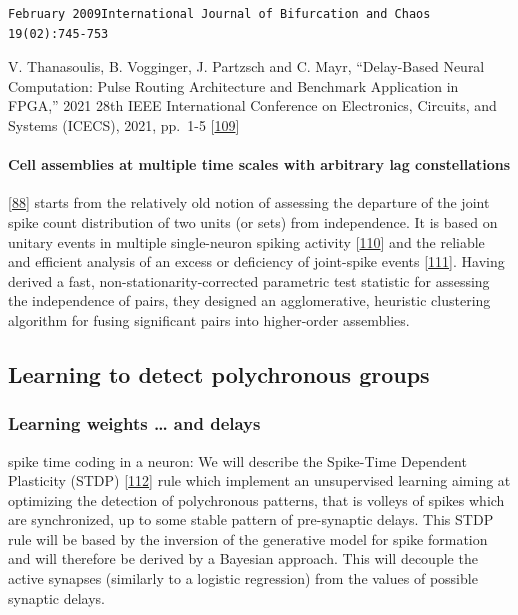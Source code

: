 \begin{verbatim}
February 2009International Journal of Bifurcation and Chaos 19(02):745-753
\end{verbatim}

V. Thanasoulis, B. Vogginger, J. Partzsch and C. Mayr, ``Delay-Based Neural Computation: Pulse Routing Architecture and Benchmark Application in FPGA,'' 2021 28th IEEE International Conference on Electronics, Circuits, and Systems (ICECS), 2021, pp.~1-5
{[}\protect\hyperlink{ref-1DadetlqZ}{109}{]}

\hypertarget{cell-assemblies-at-multiple-time-scales-with-arbitrary-lag-constellations}{%
\paragraph{Cell assemblies at multiple time scales with arbitrary lag constellations}\label{cell-assemblies-at-multiple-time-scales-with-arbitrary-lag-constellations}}

{[}\protect\hyperlink{ref-RrgzWOSk}{88}{]} starts from the relatively old notion of assessing the departure of the joint spike count distribution of two units (or sets) from independence. It is based on unitary events in multiple single-neuron spiking activity {[}\protect\hyperlink{ref-iNkKTYaI}{110}{]} and the reliable and efficient analysis of an excess or deficiency of joint-spike events {[}\protect\hyperlink{ref-14wpaupd5}{111}{]}. Having derived a fast, non-stationarity-corrected parametric test statistic for assessing the independence of pairs, they designed an agglomerative, heuristic clustering algorithm for fusing significant pairs into higher-order assemblies.

\hypertarget{learning-to-detect-polychronous-groups}{%
\subsection{Learning to detect polychronous groups}\label{learning-to-detect-polychronous-groups}}

\hypertarget{learning-weights-and-delays}{%
\subsubsection{Learning weights \ldots{} and delays}\label{learning-weights-and-delays}}

spike time coding in a neuron: We will describe the Spike-Time Dependent Plasticity (STDP) {[}\protect\hyperlink{ref-19NyVq80B}{112}{]} rule which implement an unsupervised learning aiming at optimizing the detection of polychronous patterns, that is volleys of spikes which are synchronized, up to some stable pattern of pre-synaptic delays. This STDP rule will be based by the inversion of the generative model for spike formation and will therefore be derived by a Bayesian approach. This will decouple the active synapses (similarly to a logistic regression) from the values of possible synaptic delays.

